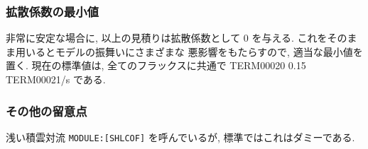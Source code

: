 \subsubsection{拡散係数の最小値}

非常に安定な場合に, 以上の見積りは拡散係数として 0 を与える.
これをそのまま用いるとモデルの振舞いにさまざまな
悪影響をもたらすので, 適当な最小値を置く.
現在の標準値は, 全てのフラックスに共通で
TERM00020 0.15 TERM00021/s である.

\subsubsection{その他の留意点}

浅い積雲対流 \texttt{MODULE:[SHLCOF]} を呼んでいるが, 
標準ではこれはダミーである.
